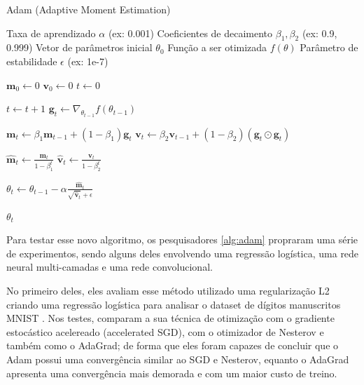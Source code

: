\begin{algorithm}[H]
    \caption{Adam (Adaptive Moment Estimation)}
    \label{alg:adam-corrigido}
    \begin{algorithmic}[1]

    \Require Taxa de aprendizado $\alpha$ (ex: 0.001)
    \Require Coeficientes de decaimento $\beta_1, \beta_2$ (ex: 0.9, 0.999)
    \Require Vetor de parâmetros inicial $\theta_0$
    \Require Função a ser otimizada $f(\theta)$
    \Require Parâmetro de estabilidade $\epsilon$ (ex: 1e-7)

    \State $\mathbf{m}_0 \leftarrow 0$ 
    \State $\mathbf{v}_0 \leftarrow 0$ 
    \State $t \leftarrow 0$ 

        \State $t \leftarrow t + 1$
        \State $\mathbf{g}_t \leftarrow \nabla_{\theta_{t-1}} f(\theta_{t-1})$
        
        \State $\mathbf{m}_t \leftarrow \beta_1 \mathbf{m}_{t-1} + (1 - \beta_1) \mathbf{g}_t$
        \State $\mathbf{v}_t \leftarrow \beta_2 \mathbf{v}_{t-1} + (1 - \beta_2) (\mathbf{g}_t \odot \mathbf{g}_t)$
        
        \State $\mathbf{\hat{m}}_t \leftarrow \frac{\mathbf{m}_t}{1 - \beta_1^t}$
        \State $\mathbf{\hat{v}}_t \leftarrow \frac{\mathbf{v}_t}{1 - \beta_2^t}$
        
        \State $\theta_t \leftarrow \theta_{t-1} - \alpha \frac{\mathbf{\hat{m}}_t}{\sqrt{\mathbf{\hat{v}}_t} + \epsilon}$
    \EndWhile

    \State \Return $\theta_t$ 
    \end{algorithmic}
\end{algorithm}

Para testar esse novo algoritmo, os pesquisadores \ref{alg:adam} propraram uma série de experimentos, sendo alguns deles envolvendo uma regressão logística, uma rede neural multi-camadas e uma rede convolucional.

No primeiro deles, eles avaliam esse método utilizado uma regularização L2 criando uma regressão logística para analisar o dataset de dígitos manuscritos MNIST \parencite{AdamMethod}. Nos testes, \textcite{AdamMethod} comparam a sua técnica de otimização com o gradiente estocástico acelereado (accelerated SGD), com o otimizador de Nesterov e também como o AdaGrad; de forma que eles foram capazes de concluir que o Adam possui uma convergência similar ao SGD e Nesterov, equanto o AdaGrad apresenta uma convergência mais demorada e com um maior custo de treino.

